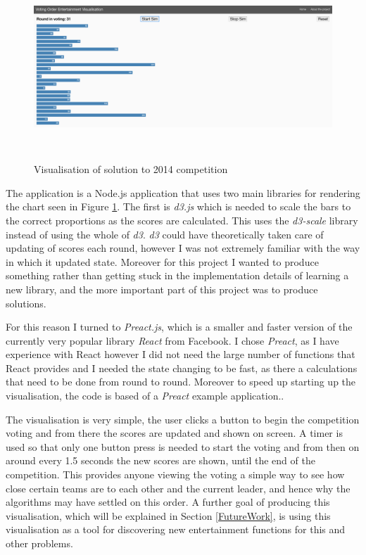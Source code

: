 \documentclass[12pt]{report}
\begin{document}
\begin{figure}[H]
\centering
\includegraphics[width=15cm, height=7cm]{./visualisation}
\caption{Visualisation of solution to 2014 competition}
\label{visScreenshot}
\end{figure}

The application is a Node.js application that uses two main libraries for rendering the chart seen in Figure \ref{visScreenshot}. The first is \textit{d3.js} which is needed to scale the bars to the correct proportions as the scores are calculated. This uses the \textit{d3-scale} library\cite{d3} instead of using the whole of \textit{d3}. \textit{d3} could have theoretically taken care of updating of scores each round, however I was not extremely familiar with the way in which it updated state. Moreover for this project I wanted to produce something rather than getting stuck in the implementation details of learning a new library, and the more important part of this project was to produce solutions.

For this reason I turned to \textit{Preact.js}\cite{Preact}, which is a smaller and faster version of the currently very popular library \textit{React}\cite{React} from Facebook. I chose \textit{Preact}, as I have experience with React however I did not need the large number of functions that React provides and I needed the state changing to be fast, as there a calculations that need to be done from round to round. Moreover to speed up starting up the visualisation, the code is based of a \textit{Preact} example application.\cite{PreactBoilerplate}.

The visualisation is very simple, the user clicks a button to begin the competition voting and from there the scores are updated and shown on screen. A timer is used so that only one button press is needed to start the voting and from then on around every 1.5 seconds the new scores are shown, until the end of the competition. This provides anyone viewing the voting a simple way to see how close certain teams are to each other and the current leader, and hence why the algorithms may have settled on this order. A further goal of producing this visualisation, which will be explained in Section \ref{FutureWork}, is using this visualisation as a tool for discovering new entertainment functions for this and other problems. 
\end{document}
